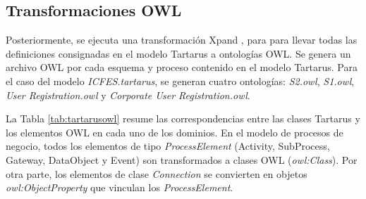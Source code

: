 \subsection{Transformaciones OWL}
Posteriormente, se ejecuta una transformaci\'on Xpand \cite{Xpand:2006}, para para llevar todas las definiciones consignadas en el modelo Tartarus a ontolog\'ias OWL. Se genera un archivo OWL por cada esquema y proceso contenido en el modelo Tartarus. Para el caso del modelo \textit{ICFES.tartarus}, se generan cuatro ontolog\'ias: \textit{S2.owl}, \textit{S1.owl}, \textit{User Registration.owl} y \textit{Corporate User Registration.owl}.

La Tabla \ref{tab:tartarusowl} resume las correspondencias entre las clases Tartarus y los elementos OWL en cada uno de los dominios. En el modelo de procesos de negocio, todos los elementos de tipo \textit{ProcessElement} (Activity, SubProcess, Gateway, DataObject y Event) son transformados a clases OWL (\textit{owl:Class}). Por otra parte, los elementos de clase \textit{Connection} se convierten en objetos \textit{owl:ObjectProperty} que vinculan los \textit{ProcessElement}. 


\begin{table}
\begin{center}
\end{center}
\caption{Transformaciones de Conceptos Tartarus a Elementos OWL}
\label{tab:tartarusowl}
\end{table}

